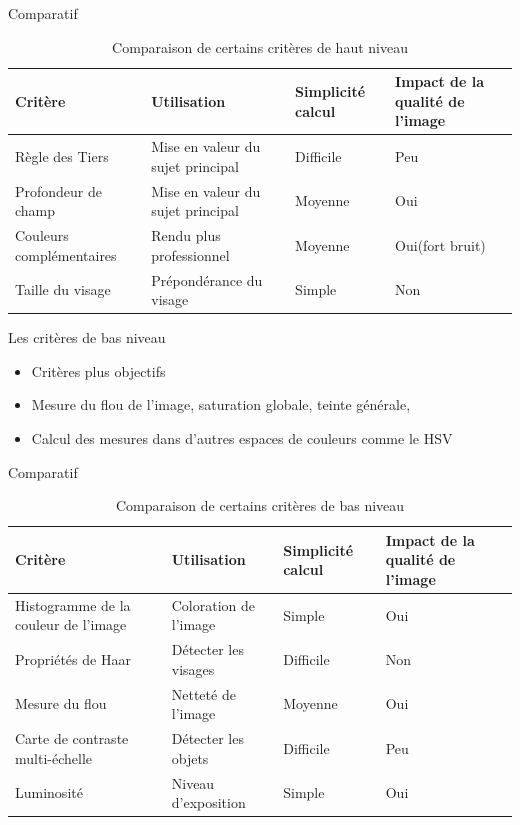 \documentclass{beamer}
\begin{document}
\begin{frame}{Comparatif}

\begin{table}
\caption{Comparaison de certains critères de haut niveau}
\begin{tabular}{|p{2.5cm}|p{3cm}|p{1.5cm}|p{2cm}|}
\hline
\textbf{Critère} & \textbf{Utilisation} & \textbf{Simplicité  calcul} & \textbf{Impact de la qualité de l'image} \\ \hline
Règle des Tiers & Mise en valeur du sujet principal & Difficile & Peu \\ \hline
Profondeur de champ & Mise en valeur du sujet principal & Moyenne & Oui \\ \hline
Couleurs complémentaires & Rendu plus professionnel & Moyenne & Oui(fort bruit) \\ \hline
Taille du visage & Prépondérance du visage & Simple & Non \\ \hline
\end{tabular}
\label{ComparaisonHautNiveau}
\end{table}

\end{frame}

\begin{frame}{Les critères de bas niveau}

\begin{itemize}
\item Critères plus objectifs
\item Mesure du flou de l'image, saturation globale, teinte générale, 
\item Calcul des mesures dans d'autres espaces de couleurs comme le HSV
\end{itemize}

\end{frame}

\begin{frame}{Comparatif}

\begin{table}
\caption{Comparaison de certains critères de bas niveau}
\begin{tabular}{|p{3cm}|p{2.5cm}|p{1.5cm}|p{2cm}|}
\hline
Critère & Utilisation & Simplicité  calcul & Impact de la qualité de l'image \\ \hline
Histogramme de la couleur de l'image & Coloration de l'image & Simple & Oui \\ \hline
Propriétés de Haar & Détecter les visages & Difficile & Non \\ \hline
Mesure du flou & Netteté de l'image & Moyenne & Oui \\ \hline
Carte de contraste multi-échelle & Détecter les objets & Difficile & Peu \\ \hline
Luminosité & Niveau d'exposition & Simple & Oui \\ \hline
\end{tabular}
\label{ComparaisonBasNiveau}
\end{table}

\end{frame}
\end{document}
